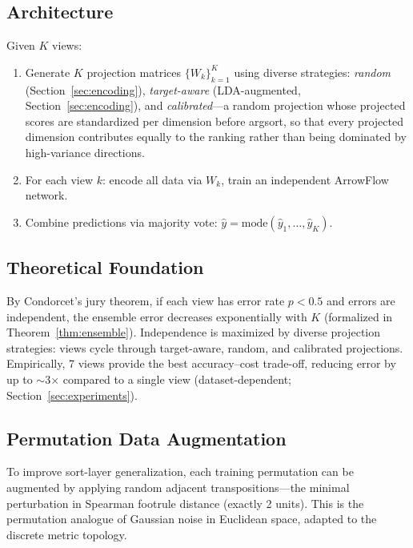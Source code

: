 \documentclass[12pt]{article}
\begin{document}
\subsection{Architecture}
Given $K$ views:
\begin{enumerate}
  \item Generate $K$ projection matrices $\{W_k\}_{k=1}^K$ using diverse strategies: \emph{random} (Section~\ref{sec:encoding}), \emph{target-aware} (LDA-augmented, Section~\ref{sec:encoding}), and \emph{calibrated}---a random projection whose projected scores are standardized per dimension before argsort, so that every projected dimension contributes equally to the ranking rather than being dominated by high-variance directions.
  \item For each view $k$: encode all data via $W_k$, train an independent ArrowFlow network.
  \item Combine predictions via majority vote: $\hat{y} = \mathrm{mode}(\hat{y}_1, \dots, \hat{y}_K)$.
\end{enumerate}

\subsection{Theoretical Foundation}
By Condorcet's jury theorem, if each view has error rate $p < 0.5$ and errors are independent, the ensemble error decreases exponentially with $K$ (formalized in Theorem~\ref{thm:ensemble}). Independence is maximized by diverse projection strategies: views cycle through target-aware, random, and calibrated projections. Empirically, 7 views provide the best accuracy--cost trade-off, reducing error by up to $\sim$3$\times$ compared to a single view (dataset-dependent; Section~\ref{sec:experiments}).

\subsection{Permutation Data Augmentation}
To improve sort-layer generalization, each training permutation can be augmented by applying random adjacent transpositions---the minimal perturbation in Spearman footrule distance (exactly 2 units). This is the permutation analogue of Gaussian noise in Euclidean space, adapted to the discrete metric topology.
\end{document}
